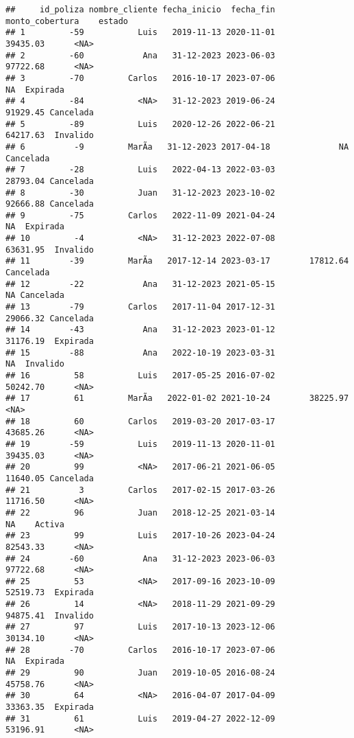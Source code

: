 \documentclass[
]{article}
\begin{document}
\begin{verbatim}
##     id_poliza nombre_cliente fecha_inicio  fecha_fin monto_cobertura    estado
## 1         -59           Luis   2019-11-13 2020-11-01        39435.03      <NA>
## 2         -60            Ana   31-12-2023 2023-06-03        97722.68      <NA>
## 3         -70         Carlos   2016-10-17 2023-07-06              NA  Expirada
## 4         -84           <NA>   31-12-2023 2019-06-24        91929.45 Cancelada
## 5         -89           Luis   2020-12-26 2022-06-21        64217.63  Invalido
## 6          -9         MarÃ­a   31-12-2023 2017-04-18              NA Cancelada
## 7         -28           Luis   2022-04-13 2022-03-03        28793.04 Cancelada
## 8         -30           Juan   31-12-2023 2023-10-02        92666.88 Cancelada
## 9         -75         Carlos   2022-11-09 2021-04-24              NA  Expirada
## 10         -4           <NA>   31-12-2023 2022-07-08        63631.95  Invalido
## 11        -39         MarÃ­a   2017-12-14 2023-03-17        17812.64 Cancelada
## 12        -22            Ana   31-12-2023 2021-05-15              NA Cancelada
## 13        -79         Carlos   2017-11-04 2017-12-31        29066.32 Cancelada
## 14        -43            Ana   31-12-2023 2023-01-12        31176.19  Expirada
## 15        -88            Ana   2022-10-19 2023-03-31              NA  Invalido
## 16         58           Luis   2017-05-25 2016-07-02        50242.70      <NA>
## 17         61         MarÃ­a   2022-01-02 2021-10-24        38225.97      <NA>
## 18         60         Carlos   2019-03-20 2017-03-17        43685.26      <NA>
## 19        -59           Luis   2019-11-13 2020-11-01        39435.03      <NA>
## 20         99           <NA>   2017-06-21 2021-06-05        11640.05 Cancelada
## 21          3         Carlos   2017-02-15 2017-03-26        11716.50      <NA>
## 22         96           Juan   2018-12-25 2021-03-14              NA    Activa
## 23         99           Luis   2017-10-26 2023-04-24        82543.33      <NA>
## 24        -60            Ana   31-12-2023 2023-06-03        97722.68      <NA>
## 25         53           <NA>   2017-09-16 2023-10-09        52519.73  Expirada
## 26         14           <NA>   2018-11-29 2021-09-29        94875.41  Invalido
## 27         97           Luis   2017-10-13 2023-12-06        30134.10      <NA>
## 28        -70         Carlos   2016-10-17 2023-07-06              NA  Expirada
## 29         90           Juan   2019-10-05 2016-08-24        45758.76      <NA>
## 30         64           <NA>   2016-04-07 2017-04-09        33363.35  Expirada
## 31         61           Luis   2019-04-27 2022-12-09        53196.91      <NA>

\end{verbatim}
\end{document}
